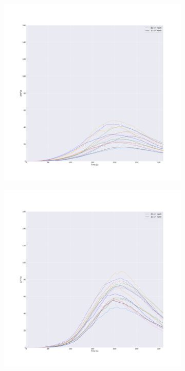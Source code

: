 \documentclass{article}
\begin{document}
\begin{figure}[htbp]
  \centering
  \begin{subfigure}[t]{.45\textwidth}
      \centering
      \includegraphics[width=\textwidth,keepaspectratio]{figures/053mesh_sensitivity.pdf}
      \caption{}
      \label{fig:0.53mesh_sensitivity}
  \end{subfigure}
  \begin{subfigure}[t]{.45\textwidth}
      \centering
      \includegraphics[width=\textwidth ,keepaspectratio]{figures/107mesh_sensitivity.pdf}

\end{subfigure}
\end{figure}
\end{document}

